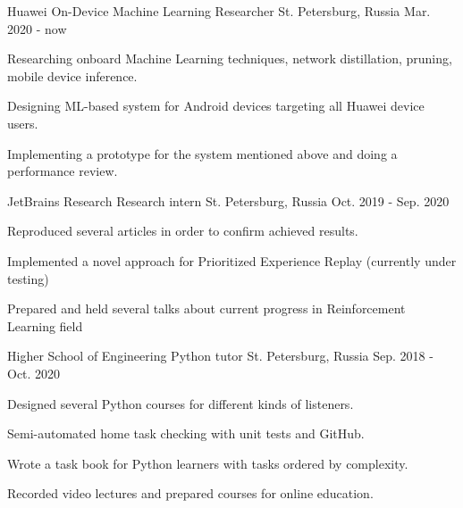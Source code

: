 

\begin{cventries}
	
\cventry
	{Huawei} %
	{On-Device Machine Learning Researcher} %
	{St. Petersburg, Russia} %
	{Mar. 2020 - now} %
	{
		\begin{cvitems} %
			\item {Researching onboard Machine Learning techniques, network distillation, pruning, mobile device inference.}
			\item {Designing ML-based system for Android devices targeting all Huawei device users.}
			\item {Implementing a prototype for the system mentioned above and doing a performance review.}
		\end{cvitems}
	}
	
  \cventry
	{JetBrains Research} %
	{Research intern} %
	{St. Petersburg, Russia} %
	{Oct. 2019 - Sep. 2020} %
	{
		\begin{cvitems} %
			\item {Reproduced several articles in order to confirm achieved results.}
			\item {Implemented a novel approach for Prioritized Experience Replay (currently under testing)}
			\item {Prepared and held several talks about current progress in Reinforcement Learning field}
		\end{cvitems}
}

  \cventry
    {Higher School of Engineering} %
    {Python tutor} %
    {St. Petersburg, Russia} %
    {Sep. 2018 - Oct. 2020} %
    {
		\begin{cvitems} %
		 \item {Designed several Python courses for different kinds of listeners.}
		 \item {Semi-automated home task checking with unit tests and GitHub.}
		 \item {Wrote a task book for Python learners with tasks ordered by complexity.}
		 \item {Recorded video lectures and prepared courses for online education.}
		\end{cvitems}
    }


\end{cventries}
